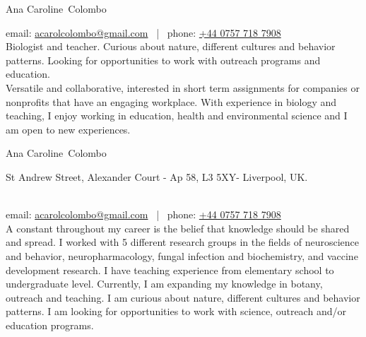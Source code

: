 \documentclass[11pt, a4paper]{article}
\makeatletter
\newcommand{\FirstName}{Ana Caroline}
\newcommand{\LastName}{Colombo}
\newcommand{\MyName}{\FirstName\ \LastName}
\newcommand{\Email}{acarolcolombo@gmail.com}
\newcommand{\phone}{+44 0757 718 7908}
\newcommand{\Address}{
    St Andrew Street, Alexander Court - Ap 58, L3 5XY- Liverpool, UK.
}
\makeatother
\begin{document}
\thispagestyle{empty}


\begin{center}
	{\fontsize{20pt}{0}\selectfont \MyName}
	\\[0.3cm]
	{\fontsize{10pt}{0}\selectfont
		email: \href{mailto:\Email}{\Email}
		\, | \,
		phone: \href{mailto:\phone}{\phone}
		\\[0.3cm]
		
		{\fontsize{10pt}{0}\selectfont Biologist and teacher. Curious about nature, different cultures and behavior patterns. Looking for opportunities to work with outreach programs and education.}
		\\[0.2cm]
		
		 {\fontsize{10pt}{0}\selectfont Versatile and collaborative, interested in short term assignments for companies or nonprofits that have an engaging workplace. With experience in biology and teaching, I enjoy working in education, health and environmental science and I am open
			to new experiences.}
		
	}
\end{center}

\begin{center}
    {\fontsize{24pt}{0}\selectfont \MyName}
    \\[0.5cm]
       {\fontsize{10pt}{0}\selectfont
        \Address
        \\[0.08cm]
        email: \href{mailto:\Email}{\Email}
        \, | \,
        phone: \href{mailto:\phone}{\phone}
         \\[0.5cm]
         {\fontsize{10pt}{0}\selectfont A constant throughout my career is the belief that knowledge should be shared and spread. I worked with 5 different research groups in the fields of neuroscience and behavior, neuropharmacology, fungal infection and biochemistry, and vaccine development research. I have teaching experience from elementary school to undergraduate level. Currently, I am expanding my knowledge in botany, outreach and teaching. I am curious about nature, different cultures and behavior patterns. I am looking for opportunities to work with science, outreach and/or education programs.}
    }
\end{center}
\end{document}
